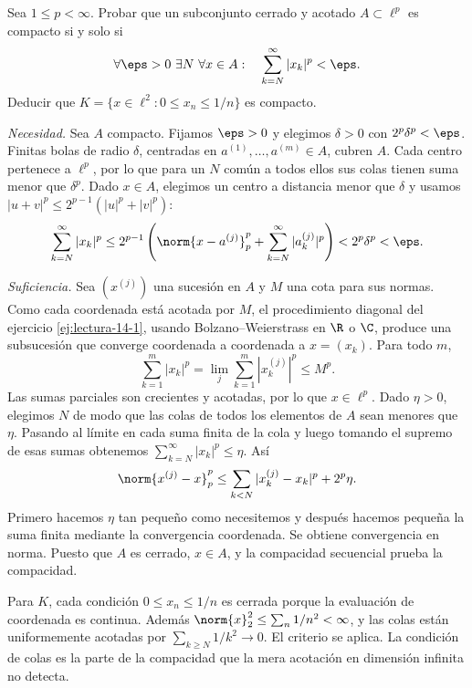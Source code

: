 \begin{ejercicio}\label{ej:lectura-14-5}
Sea $1\le p<\infty$. Probar que un subconjunto cerrado y acotado $A\subset\ell^p$ es compacto si y solo si
\[
\forall\eps>0\ \exists N\ \forall x\in A:\quad
\sum_{k=N}^\infty |x_k|^p<\eps.
\]
Deducir que $K=\{x\in\ell^2:0\le x_n\le1/n\}$ es compacto.
\end{ejercicio}
\begin{solucion}
\emph{Necesidad.} Sea $A$ compacto. Fijamos $\eps>0$ y elegimos $\delta>0$ con $2^p\delta^p<\eps$. Finitas bolas de radio $\delta$, centradas en $a^{(1)},\ldots,a^{(m)}\in A$, cubren $A$. Cada centro pertenece a $\ell^p$, por lo que para un $N$ común a todos ellos sus colas tienen suma menor que $\delta^p$. Dado $x\in A$, elegimos un centro a distancia menor que $\delta$ y usamos $|u+v|^p\le2^{p-1}(|u|^p+|v|^p)$:
\[
\sum_{k=N}^\infty|x_k|^p
\le2^{p-1}\left(\norm{x-a^{(j)}}_p^p+
\sum_{k=N}^\infty|a_k^{(j)}|^p\right)<2^p\delta^p<\eps.
\]

\emph{Suficiencia.} Sea $(x^{(j)})$ una sucesión en $A$ y $M$ una cota para sus normas. Como cada coordenada está acotada por $M$, el procedimiento diagonal del ejercicio \ref{ej:lectura-14-1}, usando Bolzano--Weierstrass en $\R$ o $\C$, produce una subsucesión que converge coordenada a coordenada a $x=(x_k)$. Para todo $m$,
\[
\sum_{k=1}^m|x_k|^p=\lim_j\sum_{k=1}^m|x_k^{(j)}|^p\le M^p.
\]
Las sumas parciales son crecientes y acotadas, por lo que $x\in\ell^p$. Dado $\eta>0$, elegimos $N$ de modo que las colas de todos los elementos de $A$ sean menores que $\eta$. Pasando al límite en cada suma finita de la cola y luego tomando el supremo de esas sumas obtenemos $\sum_{k=N}^\infty|x_k|^p\le\eta$. Así
\[
\norm{x^{(j)}-x}_p^p
\le\sum_{k<N}|x_k^{(j)}-x_k|^p+2^p\eta.
\]
Primero hacemos $\eta$ tan pequeño como necesitemos y después hacemos pequeña la suma finita mediante la convergencia coordenada. Se obtiene convergencia en norma. Puesto que $A$ es cerrado, $x\in A$, y la compacidad secuencial prueba la compacidad.

Para $K$, cada condición $0\le x_n\le1/n$ es cerrada porque la evaluación de coordenada es continua. Además $\norm{x}_2^2\le\sum_n1/n^2<\infty$, y las colas están uniformemente acotadas por $\sum_{k\ge N}1/k^2\to0$. El criterio se aplica. La condición de colas es la parte de la compacidad que la mera acotación en dimensión infinita no detecta.
\end{solucion}

